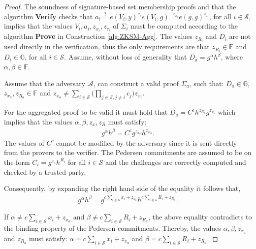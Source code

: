 \begin{proof}
The soundness of signature-based set membership proofs and that the algorithm \textbf{Verify} checks that $a_i\overset{?}{=} e(V_i,y)^{c_i}e(V_i,g)^{-z_{x_i}}e(g,g)^{z_{\tau_i}}$,  for all $i\in\mathcal{S}$, implies that the values $V_i,a_i,z_{x_i},z_{\tau_i}$ of $\Sigma_i$ must be computed according to the algorithm \textbf{Prove} in Construction \ref{alg:ZKSM-Agg}. The values $z_{R_i}$ and $D_i$ are not used directly in the verification, thus the only requirements are that $z_{R_i}\in\mathds{F}$ and $D_i\in\mathds{G}$, for all $i\in\mathcal{S}$.  Assume, without loss of generality that  $D_a=g^\alpha h^\beta$, where $\alpha,\beta\in\mathds{F}$. 

Assume that the adversary $\mathcal{A}$, can construct a valid proof $\Sigma_a$, such that: $D_a\in\mathds{G}$, $z_{x_a},z_{R_a}\in\mathds{F}$ and  $z_{x_a} \neq \sum_{i\in\mathcal{S}} \Big( \prod_{j\in\mathcal{S}, j\neq i} c_j \big) z_{x_i}$. 


For the aggregated proof to be valid it must hold that $D_a= C^ch^{z_{R_a}}g^{z_{x_a}}$ which implies that the values $\alpha,\beta,z_x,z_R$ must satisfy:
\begin{align*}
g^\alpha h^\beta  = C^cg^{z_{x_a}}h^{z_{R_a}}.
\end{align*}
The values of $C^c $ cannot be modified by the adversary since it is sent directly from the provers to the verifier. The Pedersen commitments are assumed to be on the form $C_i= g^{x_i}h^{R_i}$ for all $i\in\mathcal{S}$ and the challenges are correctly computed and checked by a trusted party.

Consequently, by expanding the right hand side of the equality it follows that,
\begin{align*}
g^\alpha h^\beta =  g^{c \sum_{i\in\mathcal{S}}x_i +z_{x_a} } h^{ c \sum_{i\in\mathcal{S}}R_i +z_{R_a}   }.
\end{align*}

If $\alpha \neq c \sum_{i\in\mathcal{S}} x_i+z_{x_a}$ and $\beta\neq c\sum_{i\in\mathcal{S}}R_i +z_{R_a}$, the above equality contradicts to the binding property of the Pedersen commitments.  %
Thereby, the values $\alpha, \beta , z_{x_a}$ and $z_{R_a}$ must satisfy: 
$\alpha =  c \sum_{i\in\mathcal{S}} x_i+z_{x_a}$ 
and 
$\beta =  c \sum_{i\in\mathcal{S}} R_i +z_{R_a}$.  


\end{proof}
